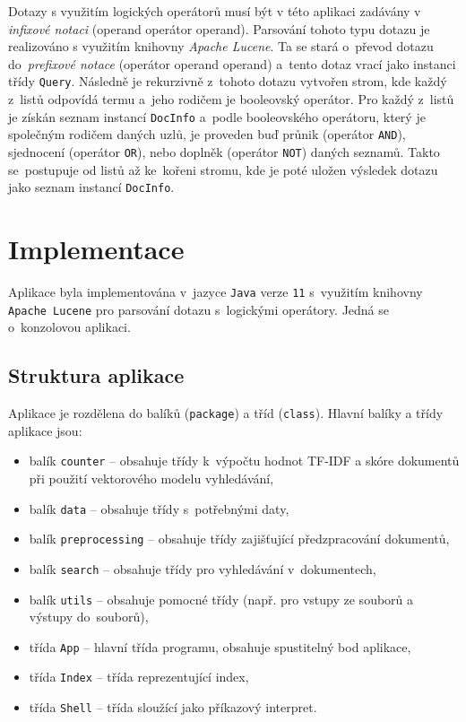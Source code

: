 \documentclass[
11pt,
a4paper,
pdftex,
czech,
titlepage
]{report}
\begin{document}
Dotazy s využitím logických operátorů musí být v této aplikaci zadávány v \textit{infixové notaci} (operand operátor operand). Parsování tohoto typu dotazu je realizováno s využitím knihovny \textit{Apache Lucene}. Ta se stará o~převod dotazu do~\textit{prefixové notace} (operátor operand operand) a~tento dotaz vrací jako instanci třídy \texttt{Query}. Následně je rekurzivně z~tohoto dotazu vytvořen strom, kde každý z~listů odpovídá termu a~jeho rodičem je booleovský operátor. Pro každý z~listů je získán seznam instancí \texttt{DocInfo} a~podle booleovského operátoru, který je společným rodičem daných uzlů, je proveden buď průnik (operátor \texttt{AND}), sjednocení (operátor \texttt{OR}), nebo doplněk (operátor \texttt{NOT}) daných seznamů. Takto se~postupuje od listů až ke~kořeni stromu, kde je poté uložen výsledek dotazu jako seznam instancí \texttt{DocInfo}.


\chapter{Implementace}
Aplikace byla implementována v~jazyce \texttt{Java} verze \texttt{11} s~využitím knihovny \texttt{Apache Lucene} pro parsování dotazu s~logickými operátory. Jedná se o~konzolovou aplikaci.

\section{Struktura aplikace}
Aplikace je rozdělena do balíků (\texttt{package}) a tříd (\texttt{class}). Hlavní balíky a třídy aplikace jsou:

\begin{itemize}
    \item balík \texttt{counter} -- obsahuje třídy k~výpočtu hodnot TF-IDF a skóre dokumentů při použití vektorového modelu vyhledávání,
    \item balík \texttt{data} -- obsahuje třídy s~potřebnými daty,
    \item balík \texttt{preprocessing} -- obsahuje třídy zajišťující předzpracování dokumentů,
    \item balík \texttt{search} -- obsahuje třídy pro vyhledávání v~dokumentech,
    \item balík \texttt{utils} -- obsahuje pomocné třídy (např. pro vstupy ze souborů a výstupy do~souborů),
    \item třída \texttt{App} -- hlavní třída programu, obsahuje spustitelný bod aplikace,
    \item třída \texttt{Index} -- třída reprezentující index,
    \item třída \texttt{Shell} -- třída sloužící jako příkazový interpret.
\end{itemize}
\end{document}
